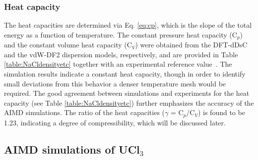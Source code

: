 \documentclass[preprint,3p,10pt,onecolumn,number,sort&compress]{elsarticle}
\begin{document}
{\subsubsection{Heat capacity} 
The heat capacities are determined via Eq. \ref{eq:cp}, which is the slope of the total energy as a function of temperature. The constant pressure heat capacity (C$_p$) and the constant volume heat capacity (C$_V$) were obtained from the DFT-dDsC and the vdW-DF2 dispersion models, respectively, and are provided in Table \ref{table:NaCldensityetc} together with an experimental reference value~\cite{NIST}. The simulation results indicate a constant heat capacity, though in order to identify small deviations from this behavior a denser temperature mesh would be required. The good agreement between simulations and experiments for the heat capacity (see Table \ref{table:NaCldensityetc}) further emphasizes the accuracy of the AIMD simulations. The ratio of the heat capacities ($\gamma$ = C$_p$/C$_V$) is found to be 1.23, indicating a degree of compressibility, which will be discussed later. 



\FloatBarrier

\subsection{AIMD simulations of UCl$_3$}
}
\end{document}
